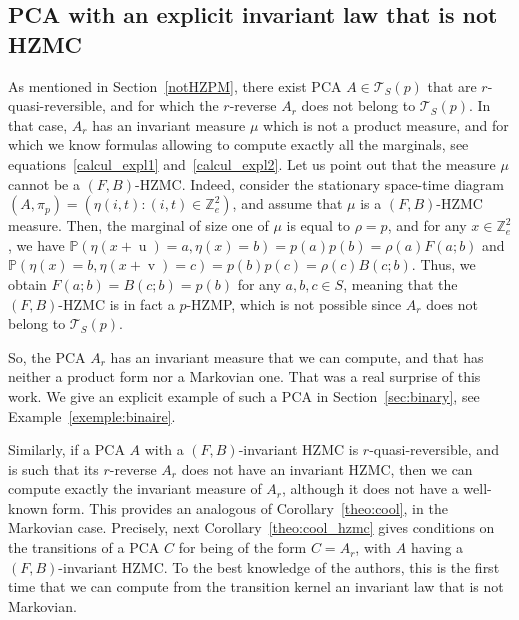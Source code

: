 \documentclass[10pt]{amsart}
\theoremstyle{definition}\newtheorem{defi}[theo]{Definition}\newtheorem{rema}[theo]{Remark}\newtheorem{exam}[theo]{Example}\newtheorem{exem}[theo]{Example}\newtheorem{nota}[theo]{Notation}
\newcounter{a}
\newcommand{\triangE}[1]{\mathcal{T}_{#1}}
\newcommand{\Z}{\mathbb{Z}}
\newcommand{\Pbb}{\mathbb{P}}
\DeclareMathOperator{\vu}{u}
\DeclareMathOperator{\vv}{v}
\begin{document}
\subsection{PCA with an explicit invariant law that is not HZMC}\label{sec:notmarkov}

As mentioned in Section~\ref{notHZPM}, there exist PCA $A\in\triangE{S}(p)$ that are $r$-quasi-reversible, and for which the $r$-reverse $A_r$ does not belong to $\triangE{S}(p)$. In that case, $A_r$ has an invariant measure $\mu$ which is not a product measure, and for which we know formulas allowing to compute exactly all the marginals, see equations~\eqref{calcul_expl1} and~\eqref{calcul_expl2}. Let us point out that the measure $\mu$ cannot be a $(F,B)$-HZMC. Indeed, consider the stationary space-time diagram $(A,\pi_p)=(\eta(i,t): (i,t) \in \Z_{e}^2)$, and assume that $\mu$ is a $(F,B)$-HZMC measure. Then, the marginal of size one of $\mu$ is equal to $\rho=p$, and for any $x\in \Z_{e}^2$, we have $\Pbb\left(\eta(x+\vu)=a,\eta(x)=b\right)=p(a)p(b)=\rho(a)F(a;b)$ and $\Pbb\left(\eta(x)=b,\eta(x+\vv)=c\right)=p(b)p(c)=\rho(c)B(c;b)$. Thus, we obtain \linebreak$F(a;b)=B(c;b)=p(b)$ for any $a,b,c\in S$, meaning that the $(F,B)$-HZMC is in fact a $p$-HZMP, which is not possible since $A_r$ does not belong to $\triangE{S}(p)$.

So, the PCA $A_r$ has an invariant measure that we can compute, and that has neither a product form nor a Markovian one. That was a real surprise of this work. We give an explicit example of such a PCA in Section~\ref{sec:binary}, see Example~\ref{exemple:binaire}.

Similarly, if a PCA $A$ with a $(F,B)$-invariant HZMC is $r$-quasi-reversible, and is such that its $r$-reverse $A_r$ does not have an invariant HZMC, then we can compute exactly the invariant measure of $A_r$, although it does not have a well-known form. This provides an analogous of Corollary~\ref{theo:cool}, in the Markovian case. Precisely, next Corollary~\ref{theo:cool_hzmc} gives conditions on the transitions of a PCA $C$ for being of the form $C=A_r$, with $A$ having a $(F,B)$-invariant HZMC. To the best knowledge of the authors, this is the first time that we can compute from the transition kernel an invariant law that is not Markovian.
\end{document}
